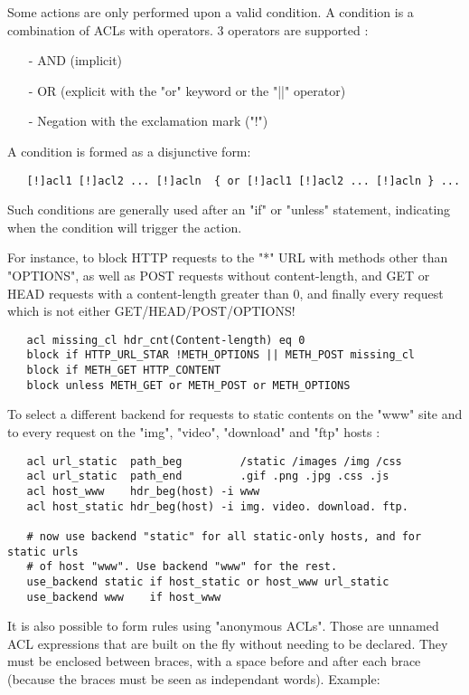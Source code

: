 Some actions are only performed upon a valid condition. A condition is a
combination of ACLs with operators. 3 operators are supported :

\begin{itemize}
\item[-] AND (implicit)
\item[-] OR  (explicit with the "or" keyword or the "||" operator)
\item[-] Negation with the exclamation mark ("!")
\end{itemize}

A condition is formed as a disjunctive form:

\begin{verbatim}
   [!]acl1 [!]acl2 ... [!]acln  { or [!]acl1 [!]acl2 ... [!]acln } ...
\end{verbatim}

Such conditions are generally used after an "if" or "unless" statement,
indicating when the condition will trigger the action.

For instance, to block HTTP requests to the "*" URL with methods other than
"OPTIONS", as well as POST requests without content-length, and GET or HEAD
requests with a content-length greater than 0, and finally every request which
is not either GET/HEAD/POST/OPTIONS!

\begin{verbatim}
   acl missing_cl hdr_cnt(Content-length) eq 0
   block if HTTP_URL_STAR !METH_OPTIONS || METH_POST missing_cl
   block if METH_GET HTTP_CONTENT
   block unless METH_GET or METH_POST or METH_OPTIONS
\end{verbatim}

To select a different backend for requests to static contents on the "www" site
and to every request on the "img", "video", "download" and "ftp" hosts :

\begin{verbatim}
   acl url_static  path_beg         /static /images /img /css
   acl url_static  path_end         .gif .png .jpg .css .js
   acl host_www    hdr_beg(host) -i www
   acl host_static hdr_beg(host) -i img. video. download. ftp.

   # now use backend "static" for all static-only hosts, and for static urls
   # of host "www". Use backend "www" for the rest.
   use_backend static if host_static or host_www url_static
   use_backend www    if host_www
\end{verbatim}

It is also possible to form rules using "anonymous ACLs". Those are unnamed ACL
expressions that are built on the fly without needing to be declared. They must
be enclosed between braces, with a space before and after each brace (because
the braces must be seen as independant words). Example:

